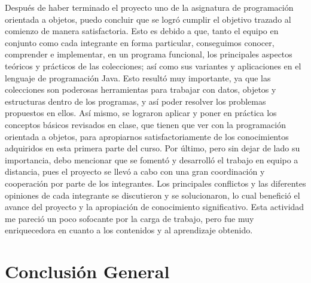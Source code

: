 \documentclass[11pt]{article}
\begin{document}
Después de haber terminado el proyecto uno de la asignatura de programación orientada a objetos, puedo concluir que se logró cumplir el objetivo trazado al comienzo de manera satisfactoria. Esto es debido a que, tanto el equipo en conjunto como cada integrante en forma particular, conseguimos conocer, comprender e implementar, en un programa funcional, los principales aspectos teóricos y prácticos de las colecciones; así como sus variantes y aplicaciones en el lenguaje de programación Java. Esto resultó muy importante, ya que las colecciones son poderosas herramientas para trabajar con datos, objetos y estructuras dentro de los programas, y así poder resolver los problemas propuestos en ellos. Así mismo, se lograron aplicar y poner en práctica los conceptos básicos revisados en clase, que tienen que ver con la programación orientada a objetos, para apropiarnos satisfactoriamente de los conocimientos adquiridos en esta primera parte del curso. Por último, pero sin dejar de lado su importancia, debo mencionar que se fomentó y desarrolló el trabajo en equipo a distancia, pues el proyecto se llevó a cabo con una gran coordinación y cooperación por parte de los integrantes. Los principales conflictos y las diferentes opiniones de cada integrante se discutieron y se solucionaron, lo cual benefició el avance del proyecto y la apropiación de conocimiento significativo. Esta actividad me pareció un poco sofocante por la carga de trabajo, pero fue muy enriquecedora en cuanto a los contenidos y al aprendizaje obtenido.


\section{Conclusión General}
\par
\end{document}
